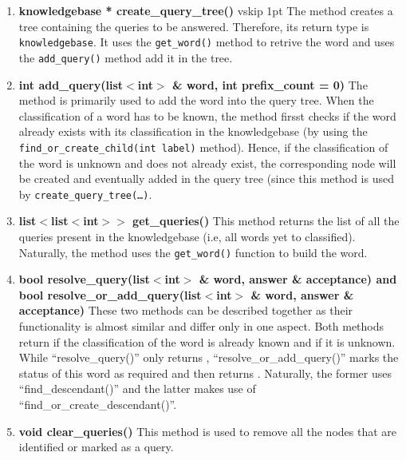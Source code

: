 \begin{enumerate}
\item \textbf{knowledgebase * create\_query\_tree()} \hfill vskip 1pt
	The method creates a tree containing the queries to be answered. Therefore, its return type is \texttt{knowledgebase}.
It uses the \texttt{get\_word()} method to retrive the word and uses the \texttt{add\_query()} method add it in the tree.

\item \textbf{int add\_query(list$<$int$>$ \& word, int prefix\_count = 0)} \hfill \vskip 1pt
	The method is primarily used to add the word into the query tree. When the classification of a word has to be known, the method firsst checks if the word already exists with its classification in the knowledgebase (by using the \texttt{find\_or\_create\_child(int label)} method). Hence, if the classification of the word is unknown and does not already exist, the corresponding node will be created and eventually added in the query tree (since this method is used by \texttt{create\_query\_tree(\ldots)}.
  
\item \textbf{list$<$list$<$int$>$$>$ get\_queries()} \hfill \vskip 1pt
	This method returns the list of all the queries present in the knowledgebase (i.e, all words yet to classified). Naturally, the method uses the \texttt{get\_word()} function to build the word.
	
\item \textbf{bool resolve\_query(list$<$int$>$ \& word, answer \& acceptance) and bool resolve\_or\_add\_query(list$<$int$>$ \& word, answer \& acceptance)} \hfill \vskip 1pt
	These two methods can be described together as their functionality is almost similar and differ only in one aspect. Both methods return \true if the classification of the word is already known and \false if it is unknown. While ``resolve\_query()'' only returns \false, ``resolve\_or\_add\_query()'' marks the status of this word as required and then returns \false. Naturally, the former uses ``find\_descendant()'' and the latter makes use of ``find\_or\_create\_descendant()''.

\item \textbf{void clear\_queries()} \hfill \vskip 1pt
	This method is used to remove all the nodes that are identified or marked as a query.
\end{enumerate}
\vskip 1pt
\vskip 1pt

